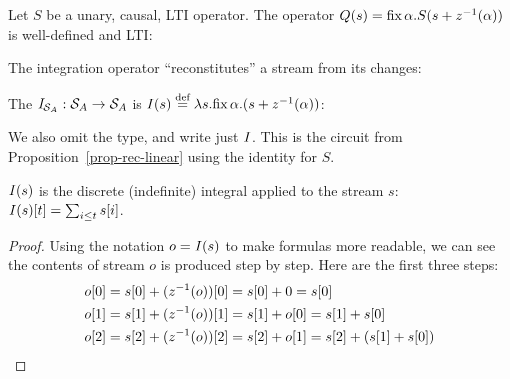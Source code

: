 \begin{proposition}
\label{prop-rec-linear}
Let $S$ be a unary, causal, LTI operator. The
operator $Q(s)=\mbox{fix}\,\alpha.S(s+z^{-1}(\alpha))$ is well-defined and LTI:

\begin{center}
\end{center}
\end{proposition}

The integration operator ``reconstitutes'' a stream from its changes:

\begin{definition}[Integration]
The  $\mathit{I}_{\mathcal{S}_{A}} : \mathcal{S}_{A} \to
\mathcal{S}_{A}$ is $\mathit{I}(s) \stackrel{\textrm{\scriptsize def}}{=} \lambda s . \mbox{fix}\,\alpha.(s +
  z^{-1}(\alpha))$:
\begin{center}
\end{center}
\end{definition}

\noindent
We also omit the type, and write just $\mathit{I}$.  This is the circuit from
Proposition~\ref{prop-rec-linear} using the identity for $S$.

\begin{proposition}
$\mathit{I}(s)$ is the discrete (indefinite) integral applied to the stream $s$:
$\mathit{I}(s)[t] = \sum_{i \leq t} s[i]$.
\end{proposition}
\begin{proof}
Using the notation $o = \mathit{I}(s)$ to make formulas more readable, we can
see the contents of stream $o$ is produced step by step.  Here are the
first three steps:
\begin{align*}
  o[0] &= s[0] + (z^{-1}(o))[0] = s[0] + 0 = s[0] \\
  o[1] &= s[1] + (z^{-1}(o))[1] = s[1] + o[0] = s[1] + s[0] \\
  o[2] &= s[2] + (z^{-1}(o))[2] = s[2] + o[1] = s[2] + (s[1] + s[0])
\end{align*}
\end{proof}

